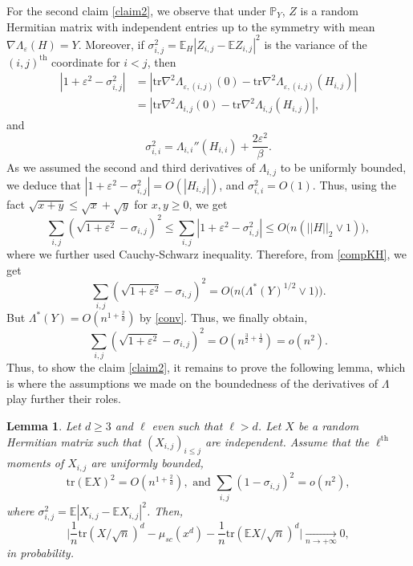 \documentclass[aop,preprint]{imsart}
\newcommand\PP{\mathbb{P}}
\newcommand\EE{\mathbb{E}}
\newcommand\tr{\mathrm{tr}}
\newcommand\eps{\varepsilon}
\numberwithin{equation}{section}
\theoremstyle{definition}
\theoremstyle{plain}
\newtheorem{Lem}[Def]{Lemma}
\theoremstyle{remark}
\begin{document}
For the second claim \eqref{claim2}, we observe that under $\PP_{Y}$, $Z$ is a random Hermitian matrix with independent entries up to the symmetry with mean $\nabla \Lambda_\eps(H) = Y$. Moreover, if $\sigma_{i,j}^2 = \EE_H| Z_{i,j} - \EE Z_{i,j}|^2$ is the variance of the $(i,j)^{\text{th}}$ coordinate for $i<j$, then
\begin{align*}
|1+\eps^2-\sigma_{i,j}^2|& =  | \tr \nabla^2\Lambda_{\eps,(i,j)}(0) - \tr \nabla^2\Lambda_{\eps,(i,j)}(H_{i,j})|\\
& = | \tr \nabla^2\Lambda_{i,j}(0) - \tr \nabla^2\Lambda_{i,j}(H_{i,j})|,\end{align*}
and
$$ \sigma_{i,i}^2 = \Lambda_{i,i}''(H_{i,i}) + \frac{2\eps^2}{\beta}.$$
As we assumed the second and third derivatives of $\Lambda_{i,j}$ to be uniformly bounded, we deduce that $|1+\eps^2-\sigma_{i,j}^2| =  O( |H_{i,j}|)$, and $\sigma_{i,i}^2 =O(1)$. Thus, using the fact $\sqrt{x+y} \leq \sqrt{x}+\sqrt{y}$ for $x,y\geq 0$, we get 
\begin{equation} \label{controlvar} \sum_{i,j} (\sqrt{1+\eps^2}-\sigma_{i,j})^2 \leq \sum_{i,j} |1+\eps^2-\sigma_{i,j}^2|\leq O\big( n (|| H||_2\vee 1)\big),\end{equation}
where we further used Cauchy-Schwarz inequality. Therefore, from \eqref{compKH}, we get
$$\sum_{i,j} (\sqrt{1+\eps^2}-\sigma_{i,j})^2 = O\big( n\big( \Lambda^*(Y)^{1/2}\vee 1\big)\big) .$$
But $\Lambda^*(Y) = O(n^{1+\frac{2}{d}})$ by \eqref{conv}. Thus, we finally obtain,
$$\sum_{i,j} (\sqrt{1+\eps^2}-\sigma_{i,j})^2 = O( n^{\frac{3}{2} + \frac{1}{d}}) = o(n^2).$$
Thus, to show the claim  \eqref{claim2}, it remains to prove the following lemma, which is where the assumptions we made on the boundedness of the derivatives of $\Lambda$ play further their roles. 


\begin{Lem}Let $d \geq 3$ and $\ell$ even such that $\ell> d$.
Let $X$ be a random Hermitian matrix such that $(X_{i,j})_{i\leq j}$ are independent. Assume that the $\ell^{\text{th}}$ moments of $X_{i,j}$ are uniformly bounded, 
$$ \tr (\EE X)^2 = O( n^{1+\frac{2}{d}}), \text{ and } \sum_{i,j} (1-\sigma_{i,j})^2 =o(n^2),$$
where $\sigma_{i,j}^2 = \EE |X_{i,j}-\EE X_{i,j}|^2$.
Then,
$$ \big| \frac{1}{n} \tr(X/\sqrt{n})^d - \mu_{sc}(x^d) - \frac{1}{n}\tr(\EE X/\sqrt{n})^d\big| \underset{n\to +\infty}{\longrightarrow} 0,$$
in probability.
\end{Lem}
\end{document}
